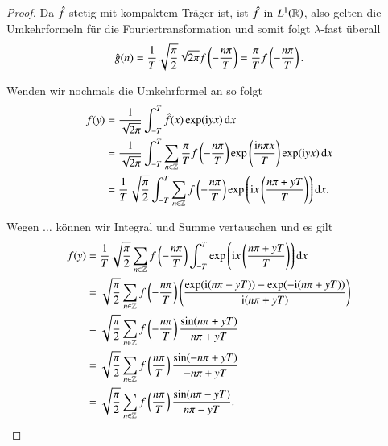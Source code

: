 \begin{proof}
  Da $\hat{f}$ stetig mit kompaktem Träger ist, ist $\hat{f}$ in $L^1(\mathbb{R})$, also gelten die Umkehrformeln für die Fouriertransformation und somit folgt $\lambda$-fast überall
  \begin{equation*}
    \hat{g}(n)=\frac{1}{T}\sqrt{\frac{\pi}{2}} \sqrt{2 \pi} f \left( -\frac{n\pi}{T} \right)
    = \frac{\pi}{T} f \left( -\frac{n\pi}{T} \right).
  \end{equation*}

  Wenden wir nochmals die Umkehrformel an so folgt
  \begin{equation*}
    \begin{split}
      f(y)
      &= \frac{1}{\sqrt{2\pi}} \int_{-T}^T{\fouriertransform{f}(x) \exp(\i yx) \dif x} \\
      &= \frac{1}{\sqrt{2\pi}} \int_{-T}^T{\sum_{n \in \Z}{\frac{\pi}{T} f\left( -\frac{n\pi}{T} \right) \exp \left( \frac{\i n\pi x}{T} \right)} \exp(\i yx)\dif x} \\
      &= \frac{1}{T} \sqrt{\frac{\pi}{2}} \int_{-T}^T{ \sum_{n \in \Z} {f \left( -\frac{n\pi}{T} \right) \exp \left( \i x \left( \frac{n\pi + yT}{T} \right) \right)} \dif x}.
    \end{split}
  \end{equation*}

  Wegen $\dots$ können wir Integral und Summe vertauschen und es gilt
  \begin{equation*}
    \begin{split}
      f(y)
      &= \frac{1}{T} \sqrt{\frac{\pi}{2}} \sum_{n \in \Z}{f \left(-\frac{n\pi}{T}\right) \int_{-T}^T{\exp \left(\i x \left( \frac{n\pi + yT}{T} \right) \right) \dif x}} \\
      &= \sqrt{\frac{\pi}{2}}\sum_{n \in \Z}{f \left(-\frac{n\pi}{T} \right) \left(\frac{\exp(\i(n\pi + yT)) - \exp(-\i(n\pi + yT))}{\i(n\pi + yT)} \right)} \\
      &= \sqrt{\frac{\pi}{2}} \sum_{n \in \Z}{f \left(-\frac{n\pi}{T}\right)\frac{\sin(n\pi + yT)}{n\pi + yT}} \\
      &= \sqrt{\frac{\pi}{2}} \sum_{n \in \Z}{f \left(\frac{n\pi}{T} \right) \frac{\sin(-n\pi + yT)}{-n\pi + yT}} \\
      &= \sqrt{\frac{\pi}{2}} \sum_{n \in \Z}{f \left(\frac{n\pi}{T} \right) \frac{\sin(n\pi - yT)}{n\pi - yT}}.
    \end{split}
  \end{equation*}
\end{proof}
